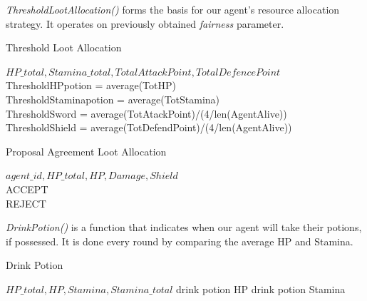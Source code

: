 \textit{ThresholdLootAllocation()} forms the basis for our agent's resource allocation strategy. It operates on previously obtained \textit{fairness} parameter. 

\begin{algorithm}
\caption{Threshold Loot Allocation}
\begin{algorithmic} 
\Require $HP\_total, Stamina\_total, TotalAttackPoint,TotalDefencePoint$
ThresholdHPpotion =  average(TotHP)\\
ThresholdStaminapotion =  average(TotStamina)\\
ThresholdSword = average(TotAtackPoint)/(4/len(AgentAlive))\\
ThresholdShield = average(TotDefendPoint)/(4/len(AgentAlive))\\
\end{algorithmic}
\end{algorithm}


\begin{algorithm}
\caption{Proposal Agreement Loot Allocation}
\begin{algorithmic}
\Require $agent\_id, HP\_total, HP, Damage, Shield$
\\
\Return ACCEPT
\Else\\
\Return REJECT
\EndIf
\EndIf
\EndIf
\EndIf
\EndIf
\end{algorithmic}
\end{algorithm}

\textit{DrinkPotion()} is a function that indicates when our agent will take their potions, if possessed. It is done every round by comparing the average HP and Stamina.

\begin{algorithm}
\caption{Drink Potion}
\begin{algorithmic} 
\Require $HP\_total, HP, Stamina, Stamina\_total$
\State drink potion HP
\EndIf
{}
\State drink potion Stamina
\EndIf
\end{algorithmic}
\end{algorithm}

